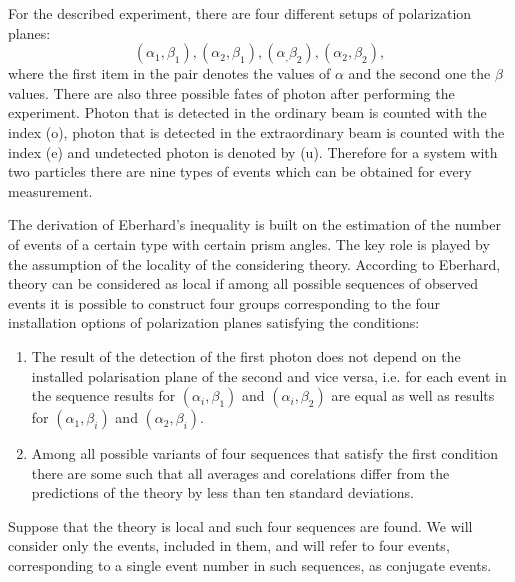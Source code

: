 \documentclass[%
master,         %
subf,           %
href,           %
colorlinks=true %
]{disser}
\numberwithin{equation}{section}
\numberwithin{figure}{section}
\begin{document}
For the described experiment, there are four different setups of polarization planes: \[
(\alpha_1, \beta_1), (\alpha_2, \beta_1), (\alpha_, \beta_2), (\alpha_2, \beta_2),
\] 
where the first item in the pair denotes the values of $\alpha$ and the second one the $\beta$ values. There are also three possible fates of photon after performing the experiment. Photon that is detected in the ordinary beam is counted with the index (o), photon that is detected in the extraordinary beam is counted with the index (e) and undetected photon is denoted by (u). Therefore for a system with two particles there are nine types of events which can be obtained for every measurement.

The derivation of Eberhard's inequality is built on the estimation of the number of events of a certain type with certain prism angles. The key role is played by the assumption of the locality of the considering theory. According to Eberhard, theory can be considered as local if among all possible sequences of observed events it is possible to construct four groups corresponding to the four installation options of polarization planes satisfying the conditions:
\begin{enumerate}[label=(\roman*)]
\item The result of the detection of the first photon does not depend on the installed
polarisation plane of the second and vice versa, i.e. for each event in the sequence results for $(\alpha_i, \beta_1)$ and $(\alpha_i, \beta_2)$ are equal as well as results for $(\alpha_1, \beta_i)$ and $(\alpha_2, \beta_i)$.
\item  Among all possible variants of four sequences that satisfy the first condition there are some such that all averages and corelations differ from the predictions of the theory by less than ten standard deviations.
\end{enumerate}

Suppose that the theory is local and such four sequences are found. We will consider only the events, included in them, and will refer to four events, corresponding to a single event number in such sequences, as conjugate events.
\end{document}
